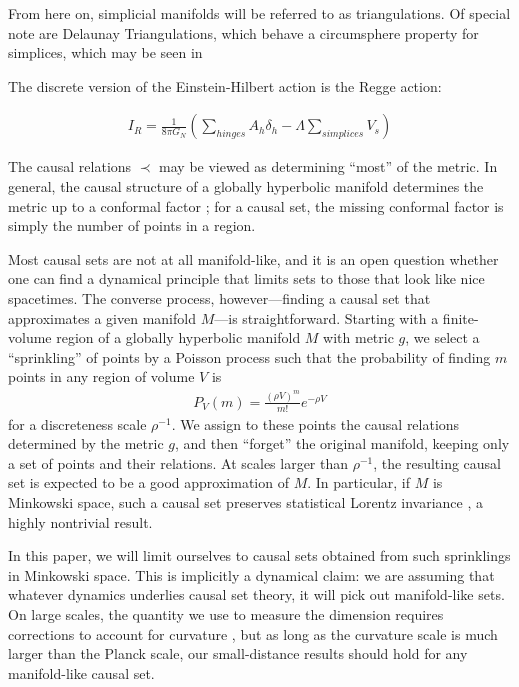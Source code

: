 \documentclass[12pt]{article}
\begin{document}
From here on, simplicial manifolds will be referred to as triangulations. Of special note are Delaunay Triangulations, which behave a circumsphere property for simplices, which may be seen in 

The discrete version of the Einstein-Hilbert action is the Regge action:

\begin{align}
  I_{R}=\frac{1}{8\pi G_{N}}\left(\sum\limits_{hinges}A_{h}\delta_{h}-\Lambda\sum\limits_{simplices}V_{s}\right)\label{equation:Regge-Action}
\end{align}

The causal relations $\prec$ may be viewed as determining ``most'' of the metric.
In general, the causal structure of a globally hyperbolic manifold determines the metric
up to a conformal factor ; for a causal set, the missing conformal factor
is simply the number of points in a region.

Most causal sets are not at all manifold-like, and it is an open question whether one
can find a dynamical principle that limits sets to those that look like nice spacetimes.
The converse process, however---finding a causal set that approximates
a given manifold $M$---is straightforward.   Starting with a finite-volume region of a
globally hyperbolic manifold $M$ with metric $g$, we select  a ``sprinkling'' of points
by a Poisson process such that the probability of finding $m$ points in any region of
volume $V$ is
\begin{align}
P_V(m) = \frac{(\rho V)^m}{m!}e^{-\rho V}
\label{a1}
\end{align}
for a discreteness scale $\rho^{-1}$.  We assign to these points the causal relations
determined by the metric $g$, and then ``forget'' the original manifold, keeping only
a set of points and their relations.   At scales larger than $\rho^{-1}$, the resulting
causal set is expected to be a good approximation of $M$.  In particular, if $M$ is
Minkowski space, such a causal set preserves statistical Lorentz invariance ,
a highly nontrivial result.

In this paper, we will limit ourselves to causal sets obtained from such sprinklings in
Minkowski space.  This is implicitly a dynamical claim: we are assuming that whatever
dynamics underlies causal set theory, it will pick out manifold-like sets.  On large
scales, the quantity we use to measure the dimension requires corrections to
account for curvature , but as long as the curvature scale is much larger
than the Planck scale, our small-distance results should hold for any manifold-like
causal set.
\end{document}

